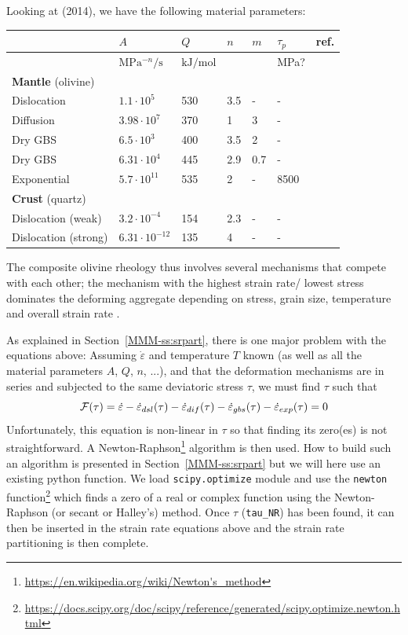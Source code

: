 Looking at \textcite{gupr14} (2014), we have the following material parameters:

\begin{center}
\begin{tabular}{lllllll}
\hline
& $A$ & $Q$ & $n$ & $m$ & $\tau_p$ & ref. \\
\hline\hline
 & $\si{\mega\pascal^{-n}\per\second}$ & $\si{\kilo\joule\per\mole}$ &&& \si{\mega\pascal}?\\
\textbf{Mantle} (olivine)  &  \\ 
Dislocation       & $1.1\cdot10^5$    &530& 3.5 & -  &-   &\cite{hiko03}\\
Diffusion         & $3.98\cdot 10^7$  &370& 1   & 3  &-   &\\
Dry GBS           & $6.5\cdot10^3$    &400& 3.5 & 2  &-   &\\
Dry GBS           & $6.31\cdot10^4$   &445& 2.9 & 0.7&-   &\cite{hazk11}\\
Exponential       & $5.7\cdot10^{11}$ &535& 2   & -  &8500&\cite{goet78}\\
\hline
\textbf{Crust} (quartz) &\\
Dislocation (weak)   &  $3.2\cdot10^{-4}$    & 154 & 2.3&- & - & \cite{kikr87}\\
Dislocation (strong) &  $6.31\cdot 10^{-12}$ & 135 & 4&- & - & \cite{hitd01}\\
\hline
\end{tabular}
\end{center}

The composite olivine rheology thus involves several mechanisms
that compete with each other; the mechanism with the highest strain rate/
lowest stress dominates the deforming aggregate depending on stress,
grain size, temperature and overall strain rate \cite{gupr14}.

As explained in Section~\ref{MMM-ss:srpart}, there is one major problem with the equations above: 
Assuming $\dot\varepsilon$ and temperature $T$ known (as well as all the material parameters $A$, $Q$, $n$, ...), 
and that the deformation mechanisms are in series and subjected to the same deviatoric stress $\tau$,
we must find $\tau$ such that 
\[
{\cal F}(\tau) = \dot\varepsilon -  \dot\varepsilon_{dsl}(\tau) 
-\dot\varepsilon_{dif}(\tau) -\dot\varepsilon_{gbs}(\tau) - \dot\varepsilon_{exp}(\tau) =0
\]
Unfortunately, this equation is non-linear in $\tau$ so that finding its zero(es) is not 
straightforward. A Newton-Raphson\footnote{\url{https://en.wikipedia.org/wiki/Newton's_method}} 
algorithm is then used. How to build such an algorithm is presented in Section~\ref{MMM-ss:srpart} 
but we will here use an existing python function. 
We load \lstinline{scipy.optimize} module and use the \lstinline{newton} function\footnote{\url{
https://docs.scipy.org/doc/scipy/reference/generated/scipy.optimize.newton.html}}
which finds a zero of a real or complex function using the Newton-Raphson (or secant or Halley’s) method.
Once $\tau$ (\lstinline{tau_NR}) has been found, it can then be inserted in the strain rate equations above and
the strain rate partitioning is then complete.

